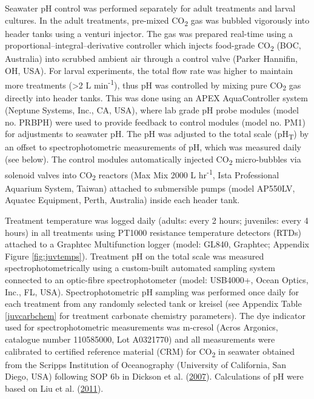 \documentclass[a4paper,10pt, oneside]{memoir}
\begin{document}
Seawater pH control was performed separately for adult treatments and larval cultures.
In the adult treatments, pre-mixed CO\textsubscript{2} gas was bubbled vigorously into header tanks using a venturi injector.
The gas was prepared real-time using a proportional--integral--derivative controller which injects food-grade CO\textsubscript{2} (BOC, Australia) into scrubbed ambient air through a control valve (Parker Hannifin, OH, USA).
For larval experiments, the total flow rate was higher to maintain more treatments (\textgreater{}2 L min\textsuperscript{-1}), thus pH was controlled by mixing pure CO\textsubscript{2} gas directly into header tanks. This was done using an APEX AquaController system (Neptune Systems, Inc., CA, USA), where lab grade pH probe modules (model no. PRBPH) were used to provide feedback to control modules (model no. PM1) for adjustments to seawater pH.
The pH was adjusted to the total scale (pH\textsubscript{T}) by an offset to spectrophotometric measurements of pH, which was measured daily (see below).
The control modules automatically injected CO\textsubscript{2} micro-bubbles via solenoid valves into CO\textsubscript{2} reactors (Max Mix 2000 L hr\textsuperscript{-1}, Ista Professional Aquarium System, Taiwan) attached to submersible pumps (model AP550LV, Aquatec Equipment, Perth, Australia) inside each header tank.

Treatment temperature was logged daily (adults: every 2 hours; juveniles: every 4 hours) in all treatments using PT1000 resistance temperature detectors (RTDs) attached to a Graphtec Multifunction logger (model: GL840, Graphtec; Appendix Figure \ref{fig:juvtemps}).
Treatment pH on the total scale was measured spectrophotometrically using a custom-built automated sampling system connected to an optic-fibre spectrophotometer (model: USB4000+, Ocean Optics, Inc., FL, USA).
Spectrophotometric pH sampling was performed once daily for each treatment from any randomly selected tank or kreisel (see Appendix Table \ref{juvcarbchem} for treatment carbonate chemistry parameters).
The dye indicator used for spectrophotometric measurements was m-cresol (Acros Argonics, catalogue number 110585000, Lot A0321770) and all measurements were calibrated to certified reference material (CRM) for CO\textsubscript{2} in seawater obtained from the Scripps Institution of Oceanography (University of California, San Diego, USA) following SOP 6b in Dickson et al. (\protect\hyperlink{ref-Dickson2007}{2007}). Calculations of pH were based on Liu et al. (\protect\hyperlink{ref-Liu2011}{2011}).
\end{document}
